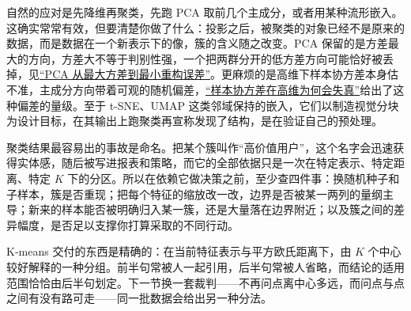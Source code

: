 自然的应对是先降维再聚类，先跑 PCA 取前几个主成分，或者用某种流形嵌入。这确实常常有效，但要清楚你做了什么：投影之后，被聚类的对象已经不是原来的数据，而是数据在一个新表示下的像，簇的含义随之改变。PCA 保留的是方差最大的方向，方差大不等于判别性强，一个把两群分开的低方差方向可能恰好被丢掉，见\hyperref[sec:13-Machine-Learning/04-Dimensionality-Reduction/01]{``PCA 从最大方差到最小重构误差''}。更麻烦的是高维下样本协方差本身估不准，主成分方向带着可观的随机偏差，\hyperref[sec:11-Mathematical-Statistics/09-Random-Matrix-Theory/01]{``样本协方差在高维为何会失真''}给出了这种偏差的量级。至于 t-SNE、UMAP 这类邻域保持的嵌入，它们以制造视觉分块为设计目标，在其输出上跑聚类再宣称发现了结构，是在验证自己的预处理。

聚类结果最容易出的事故是命名。把某个簇叫作``高价值用户''，这个名字会迅速获得实体感，随后被写进报表和策略，而它的全部依据只是一次在特定表示、特定距离、特定 \(K\) 下的分区。所以在依赖它做决策之前，至少查四件事：换随机种子和子样本，簇是否重现；把每个特征的缩放改一改，边界是否被某一两列的量纲主导；新来的样本能否被明确归入某一簇，还是大量落在边界附近；以及簇之间的差异幅度，是否足以支撑你打算采取的不同行动。

K-means 交付的东西是精确的：在当前特征表示与平方欧氏距离下，由 \(K\) 个中心较好解释的一种分组。前半句常被人一起引用，后半句常被人省略，而结论的适用范围恰恰由后半句划定。下一节换一套裁判——不再问点离中心多远，而问点与点之间有没有路可走——同一批数据会给出另一种分法。
